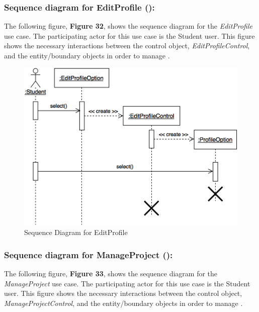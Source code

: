 \documentclass[12pt,letterpaper]{article}
\begin{document}
\subsubsection*{Sequence diagram for EditProfile (\editprofile{}):}

The following figure, {\bf Figure 32}, shows the sequence diagram for the {\it EditProfile} use case. The participating actor for this use case is the 
Student user. This figure shows the necessary interactions between the control object, {\it EditProfileControl}, and the entity/boundary objects
in order to manage \editprofile{}.

\begin{figure}[H]
	\centering{}
	\includegraphics[scale=0.3]{imgs/seq/edit-profile.png}
	\caption{Sequence Diagram for EditProfile}
\end{figure}

\subsubsection*{Sequence diagram for ManageProject (\manageproject{}):}

The following figure, {\bf Figure 33}, shows the sequence diagram for the {\it ManageProject} use case. The participating actor for this use case is the
Student user. This figure shows the necessary interactions between the control object, {\it ManageProjectControl}, and the entity/boundary objects 
in order to manage \manageproject{}.
\end{document}

